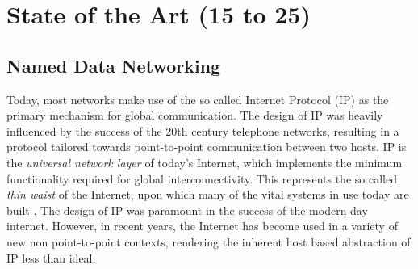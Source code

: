 \chapter{State of the Art (15 to 25)}



\section{Named Data Networking}\label{sec:ndn-sota}
Today, most networks make use of the so called Internet Protocol (IP) as the primary mechanism for global communication. The design of IP was heavily influenced by the success of the 20th century telephone networks, resulting in a protocol tailored towards point-to-point communication between two hosts. IP is the \textit{universal network layer} of today's Internet, which implements the minimum functionality required for global interconnectivity. This represents the so called \textit{thin waist} of the Internet, upon which many of the vital systems in use today are built \cite{ndn-exec-summary}. The design of IP was paramount in the success of the modern day internet. However, in recent years, the Internet has become used in a variety of new non point-to-point contexts, rendering the inherent host based abstraction of IP less than ideal.  

